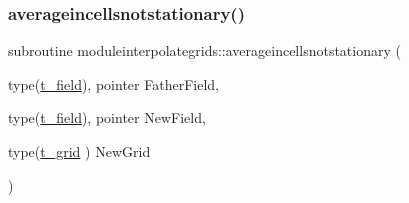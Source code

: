 \subsubsection{\texorpdfstring{averageincellsnotstationary()}{averageincellsnotstationary()}}
{\footnotesize\ttfamily subroutine moduleinterpolategrids\+::averageincellsnotstationary (\begin{DoxyParamCaption}\item[{type(\mbox{\hyperlink{structmoduleinterpolategrids_1_1t__field}{t\+\_\+field}}), pointer}]{Father\+Field,  }\item[{type(\mbox{\hyperlink{structmoduleinterpolategrids_1_1t__field}{t\+\_\+field}}), pointer}]{New\+Field,  }\item[{type(\mbox{\hyperlink{structmoduleinterpolategrids_1_1t__grid}{t\+\_\+grid}} )}]{New\+Grid }\end{DoxyParamCaption})\hspace{0.3cm}{\ttfamily [private]}}

